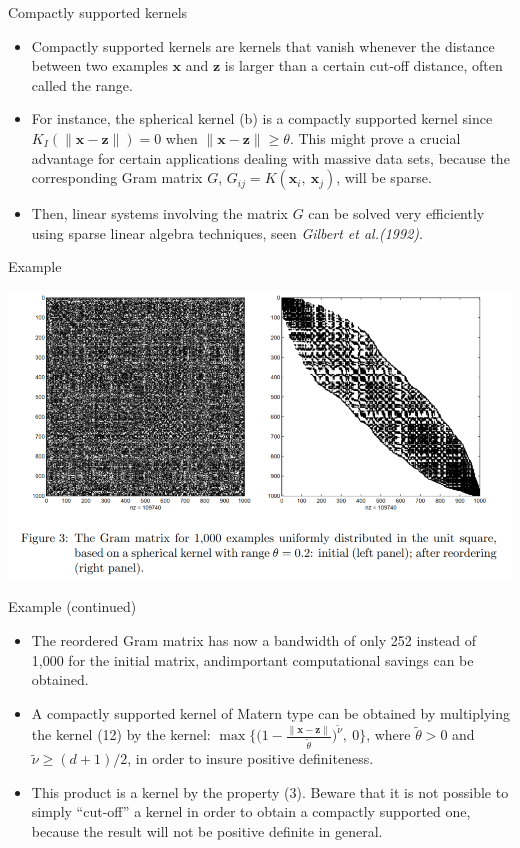 \documentclass[
  ignorenonframetext,
]{beamer}
\begin{document}
\begin{frame}{Compactly supported kernels}
\protect\hypertarget{compactly-supported-kernels}{}
\begin{itemize}
\item
  Compactly supported kernels are kernels that vanish whenever the
  distance between two examples \(\pmb x\) and \(\pmb z\) is larger than
  a certain cut-off distance, often called the range.
\item
  For instance, the spherical kernel (b) is a compactly supported kernel
  since \(K_I(\|\pmb x - \pmb z\|) = 0\) when
  \(\|\pmb x - \pmb z\| \geq \theta\). This might prove a crucial
  advantage for certain applications dealing with massive data sets,
  because the corresponding Gram matrix \(G\),
  \(G_{ij} = K(\pmb x_i,\ \pmb x_j)\), will be sparse.
\item
  Then, linear systems involving the matrix \(G\) can be solved very
  efficiently using sparse linear algebra techniques, seen \emph{Gilbert
  et al.(1992)}.
\end{itemize}
\end{frame}

\begin{frame}{Example}
\protect\hypertarget{example}{}
\begin{center}\includegraphics[width=0.8\linewidth]{figure/marc_f3} \end{center}
\end{frame}

\begin{frame}{Example (continued)}
\protect\hypertarget{example-continued}{}
\begin{itemize}
\item
  The reordered Gram matrix has now a bandwidth of only 252 instead of
  1,000 for the initial matrix, andimportant computational savings can
  be obtained.
\item
  A compactly supported kernel of Matern type can be obtained by
  multiplying the kernel (12) by the kernel:
  \(\max \Big\{ \big(1 - \frac {\|\pmb x - \pmb z\|} {\tilde \theta} \big)^{\tilde \nu},\ 0\Big\}\),
  where \(\tilde \theta > 0\) and \(\tilde \nu \geq (d + 1)/2\), in
  order to insure positive definiteness.
\item
  This product is a kernel by the property (3). Beware that it is not
  possible to simply ``cut-off'' a kernel in order to obtain a compactly
  supported one, because the result will not be positive definite in
  general.
\end{itemize}
\end{frame}
\end{document}

